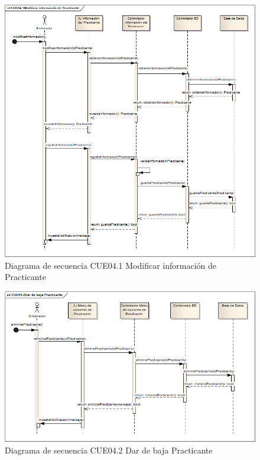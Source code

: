 \begin{figure}[H]
	\begin{center}
		\includegraphics[scale=0.6]{./Figuras/Secuencias/CUE04_1Modificar_informacion_de_Practicante}
	\end{center}
	\caption{Diagrama de secuencia CUE04.1 Modificar información de Practicante}
	\label{fig:SE_CUE041}
\end{figure}

\begin{figure}[H]
	\begin{center}
		\includegraphics[scale=0.6]{./Figuras/Secuencias/CUE04_2Dar_de_baja_Practicante}
	\end{center}
	\caption{Diagrama de secuencia CUE04.2 Dar de baja Practicante}
	\label{fig:SE_CUE042}
\end{figure}

